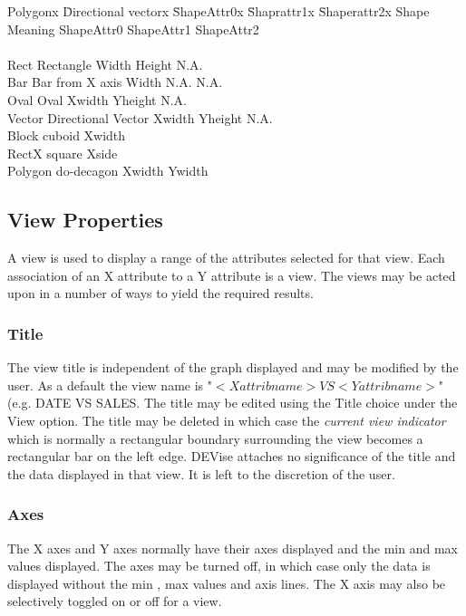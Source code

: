 \begin {tabbing}
Polygonx \= Directional vectorx \= ShapeAttr0x \= Shaprattr1x \= Shaperattr2x \kill
Shape \> Meaning \> ShapeAttr0 \> ShapeAttr1 \> ShapeAttr2 \\ \\
Rect  \> Rectangle \>  Width \> Height \> N.A.  \\
Bar   \> Bar from X axis\> Width \> N.A. \> N.A. \\
Oval  \> Oval \> Xwidth \> Yheight \> N.A.\\
Vector \> Directional Vector \> Xwidth \> Yheight \> N.A. \\
Block \> cuboid \> Xwidth \>\\
RectX \> square \> Xside\\
Polygon \> do-decagon \> Xwidth \> Ywidth\\  

\end{tabbing}

\subsection{View Properties}

A view is used to display a range of the attributes selected for that view. Each association of an X attribute to a Y attribute is a view. The views may be acted upon in a number of ways to yield the required results.


\subsubsection{Title}

The view title is independent of the graph displayed and may be modified by the user. As a default the view name is  "$<X attrib name > VS <Y attrib name >$" (e.g. DATE VS SALES. The title may be edited using the Title choice under the View option.  The title may be deleted in which case the {\em current view indicator} which is normally a rectangular boundary surrounding the view becomes a rectangular bar on the left edge. DEVise attaches no significance of the title and the data displayed in that view. It is left to the discretion of the user.

\subsubsection{Axes}

The X axes and Y axes normally have their axes displayed and the min and max values displayed. The axes may be turned off, in which case only the data is displayed without the min , max values and axis lines. The X axis may also be selectively toggled on or off for a view.

